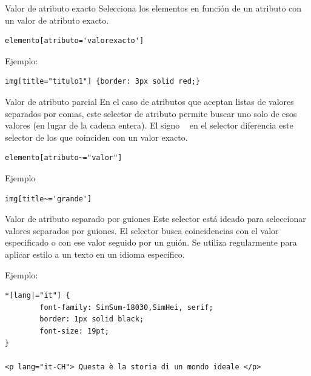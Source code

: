 \begin{frame}[fragile]{Valor de atributo exacto} %
    Selecciona los elementos en función de un atributo con un valor de atributo
    exacto.

    \begin{lstlisting}
elemento[atributo='valorexacto']
    \end{lstlisting}

    Ejemplo: 

    \begin{lstlisting}
img[title="titulo1"] {border: 3px solid red;}
    \end{lstlisting}

\end{frame}

\begin{frame}[fragile]{Valor de atributo parcial} %
    En el caso de atributos que aceptan listas de valores separados por comas,
    este selector de atributo permite buscar uno solo de esos valores (en lugar
    de la cadena entera). El signo \texttt{~} en el selector diferencia este
    selector de los que coinciden con un valor exacto. 

    \begin{lstlisting}
elemento[atributo~="valor"]
    \end{lstlisting}

    Ejemplo 
    \begin{lstlisting}
img[title~='grande']
    \end{lstlisting}
\end{frame}

\begin{frame}[fragile]{Valor de atributo separado por guiones} %
    Este selector está ideado para seleccionar valores separados por guiones.
    El selector busca coincidencias con el valor especificado o con ese valor
    seguido por un guión. Se utiliza regularmente para aplicar estilo a un
    texto en un idioma específico. 
    
    Ejemplo: 
    \begin{verbatim}
*[lang|="it"] {
        font-family: SimSum-18030,SimHei, serif; 
        border: 1px solid black;
        font-size: 19pt;
}

<p lang="it-CH"> Questa è la storia di un mondo ideale </p>
    \end{verbatim}
\end{frame}



